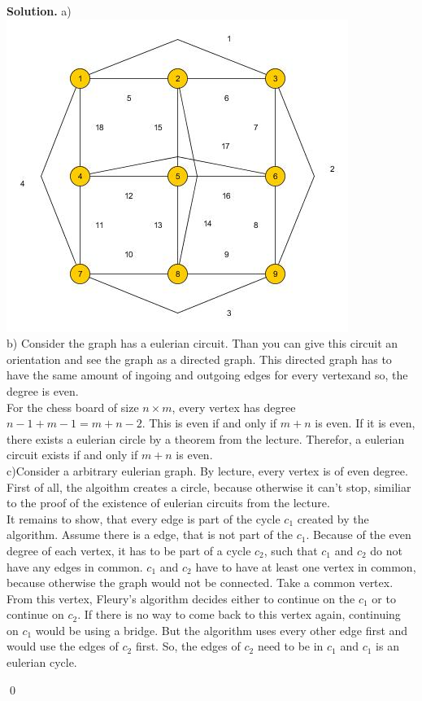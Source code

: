 \documentclass[a4paper,11pt]{amsart}
\newenvironment{solution}{\textbf{Solution.}}{\qed}
\begin{document}
\begin{solution}
	a) \\
	\includegraphics{A8.jpg} \\
	b) Consider the graph has a eulerian circuit. Than you can give this circuit an orientation and see the graph as a directed graph. This directed graph has to have the same amount of ingoing and outgoing edges for every vertexand so, the degree is even. \\
	For the chess board of size $n \times m$, every vertex has degree $n-1+m-1=m+n-2$. This is even if and only if $m+n$ is even. If it is even, there exists a eulerian circle by a theorem from the lecture. Therefor, a eulerian circuit exists if and only if $m+n$ is even. \\
	c)Consider a arbitrary eulerian graph. By lecture, every vertex is of even degree. First of all, the algoithm creates a circle, because otherwise it can't stop, similiar to the proof of the existence of eulerian circuits from the lecture. \\
	It remains to show, that every edge is part of the cycle $c_1$ created by the algorithm. Assume there is a edge, that is not part of the $c_1$. Because of the even degree of each vertex, it has to be part of a cycle $c_2$, such that $c_1$ and $c_2$ do not have any edges in common. $c_1$ and $c_2$ have to have at least one vertex in common, because otherwise the graph would not be connected. Take a common vertex. From this vertex, Fleury's algorithm decides either to continue on the $c_1$ or to continue on $c_2$. If there is no way to come back to this vertex again, continuing on $c_1$ would be using a bridge. But the algorithm uses every other edge first and would use the edges of $c_2$ first. So, the edges of $c_2$ need to be in $c_1$ and $c_1$ is an eulerian cycle.
	
\end{solution}
\end{document}
